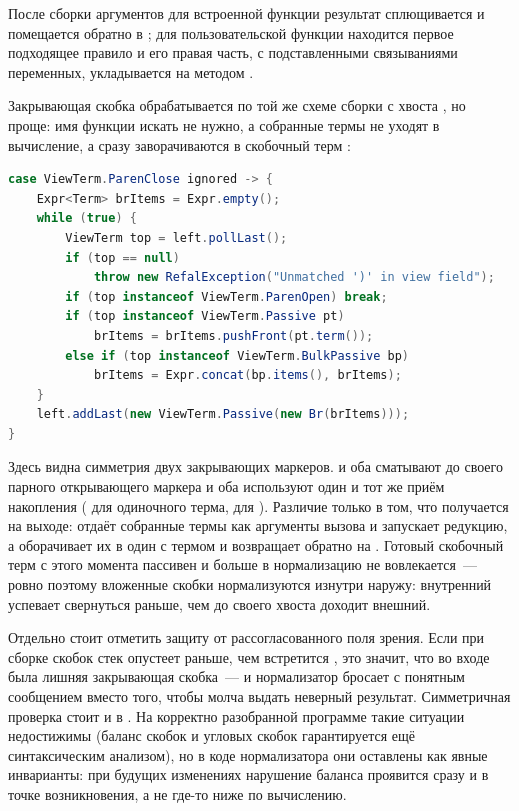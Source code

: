 После сборки аргументов для встроенной функции результат сплющивается и
помещается обратно в ; для пользовательской функции находится
первое подходящее правило и его правая часть, с подставленными связываниями
переменных, укладывается на  методом
.

Закрывающая скобка  обрабатывается по той же схеме сборки с
хвоста , но проще: имя функции искать не нужно, а собранные термы не
уходят в вычисление, а сразу заворачиваются в скобочный терм :

\begin{lstlisting}[language=Java,caption={Сборка скобочного терма по ParenClose},label={lst:parenclose}]
case ViewTerm.ParenClose ignored -> {
    Expr<Term> brItems = Expr.empty();
    while (true) {
        ViewTerm top = left.pollLast();
        if (top == null)
            throw new RefalException("Unmatched ')' in view field");
        if (top instanceof ViewTerm.ParenOpen) break;
        if (top instanceof ViewTerm.Passive pt)
            brItems = brItems.pushFront(pt.term());
        else if (top instanceof ViewTerm.BulkPassive bp)
            brItems = Expr.concat(bp.items(), brItems);
    }
    left.addLast(new ViewTerm.Passive(new Br(brItems)));
}
\end{lstlisting}

Здесь видна симметрия двух закрывающих маркеров.  и
 оба сматывают  до своего парного открывающего
маркера и оба используют один и тот же приём накопления ( для
одиночного терма,  для ). Различие
только в том, что получается на выходе:  отдаёт собранные
термы как аргументы вызова и запускает редукцию, а  оборачивает
их в один  с термом  и возвращает обратно на .
Готовый скобочный терм с этого момента пассивен и больше в нормализацию не
вовлекается~--- ровно поэтому вложенные скобки нормализуются изнутри наружу:
внутренний  успевает свернуться раньше, чем до своего хвоста
доходит внешний.

Отдельно стоит отметить защиту от рассогласованного поля зрения. Если при сборке
скобок стек  опустеет раньше, чем встретится , это
значит, что во входе была лишняя закрывающая скобка~--- и нормализатор бросает
 с понятным сообщением вместо того, чтобы молча выдать
неверный результат. Симметричная проверка стоит и в . На корректно
разобранной программе такие ситуации недостижимы (баланс скобок и угловых скобок
гарантируется ещё синтаксическим анализом), но в коде нормализатора они оставлены
как явные инварианты: при будущих изменениях нарушение баланса проявится сразу и
в точке возникновения, а не где-то ниже по вычислению.

